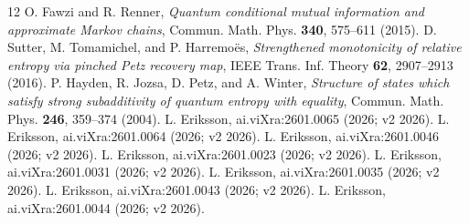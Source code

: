 \documentclass[11pt]{article}
\theoremstyle{definition}
\theoremstyle{remark}
\begin{document}
\begin{thebibliography}{12}
 O. Fawzi and R. Renner, \emph{Quantum conditional mutual
information and approximate Markov chains}, Commun. Math. Phys.
\textbf{340}, 575--611 (2015).
 D. Sutter, M. Tomamichel, and P. Harremo\"es,
\emph{Strengthened monotonicity of relative entropy via pinched Petz
recovery map}, IEEE Trans. Inf. Theory \textbf{62}, 2907--2913 (2016).
 P. Hayden, R. Jozsa, D. Petz, and A. Winter,
\emph{Structure of states which satisfy strong subadditivity of quantum
entropy with equality}, Commun. Math. Phys. \textbf{246}, 359--374
(2004).
 L. Eriksson, ai.viXra:2601.0065 (2026; v2 2026).
 L. Eriksson, ai.viXra:2601.0064 (2026; v2 2026).
 L. Eriksson, ai.viXra:2601.0046 (2026; v2 2026).
 L. Eriksson, ai.viXra:2601.0023 (2026; v2 2026).
 L. Eriksson, ai.viXra:2601.0031 (2026; v2 2026).
 L. Eriksson, ai.viXra:2601.0035 (2026; v2 2026).
 L. Eriksson, ai.viXra:2601.0043 (2026; v2 2026).
 L. Eriksson, ai.viXra:2601.0044 (2026; v2 2026).
\end{thebibliography}
\end{document}
